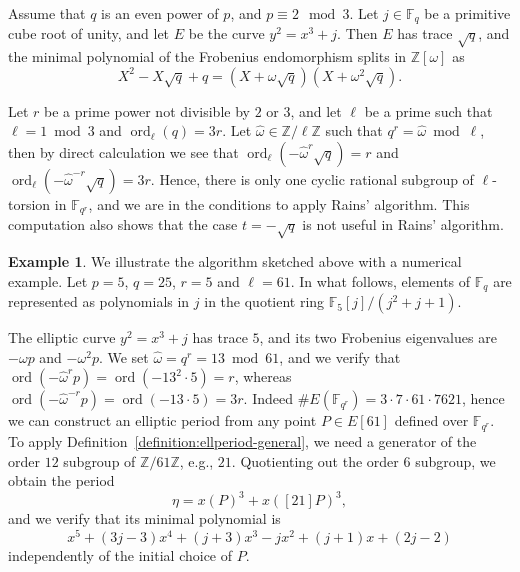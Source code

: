 \documentclass[12pt]{article}
\theoremstyle{plain}
\theoremstyle{definition}
\newtheorem{example}[theorem]{Example}
\DeclareMathOperator{\order}{ord} %
\def\Z{\ensuremath{\mathbb{Z}}}
\def\F{\ensuremath{\mathbb{F}}}
\newcounter{algorithm}
\begin{document}
Assume that $q$ is an even power of $p$, and $p\equiv 2\mod 3$. %
Let $j\in\F_q$ be a primitive cube root of unity, and let $E$ be the
curve $y^2=x^3+j$. %
Then $E$ has trace $\sqrt{q}$, and the minimal polynomial of the
Frobenius endomorphism splits in $\Z[\omega]$ as
\begin{equation*}
  X^2 - X\sqrt{q} + q = (X+\omega\sqrt{q})(X+\omega^2\sqrt{q}).
\end{equation*}

Let $r$ be a prime power not divisible by $2$ or $3$, and let $\ell$
be a prime such that $\ell=1\bmod 3$ and $\order_\ell(q)=3r$. %
Let $\hat\omega\in\Z/\ell\Z$ such that $q^r=\hat\omega\bmod\ell$, then
by direct calculation we see that
$\order_\ell(-\hat\omega^r\sqrt{q})=r$ and
$\order_\ell(-\hat\omega^{-r}\sqrt{q})=3r$. %
Hence, there is only one cyclic rational subgroup of $\ell$-torsion in
$\F_{q^r}$, and we are in the conditions to apply Rains' algorithm. %
This computation also shows that the case $t=-\sqrt{q}$ is not useful
in Rains' algorithm.

\begin{example}
  We illustrate the algorithm sketched above with a numerical
  example. %
  Let $p=5$, $q=25$, $r=5$ and $\ell=61$. %
  In what follows, elements of $\F_q$ are represented as polynomials
  in $j$ in the quotient ring $\F_5[j]/(j^2+j+1)$. %

  The elliptic curve $y^2=x^3+j$ has trace $5$, and its two Frobenius
  eigenvalues are $-\omega p$ and $-\omega^2 p$. %
  We set $\hat\omega=q^r=13\bmod 61$, and we verify that
  $\order(-\hat\omega^r p)=\order(-13^2\cdot 5)=r$, whereas
  $\order(-\hat\omega^{-r} p)=\order(-13\cdot 5)=3r$. %
  Indeed $\#E(\F_{q^r})= 3\cdot7\cdot61\cdot7621$, hence we can
  construct an elliptic period from any point $P\in E[61]$ defined
  over $\F_{q^r}$. %
  To apply Definition~\ref{definition:ellperiod-general}, we need a
  generator of the order $12$ subgroup of $\Z/61\Z$, e.g., $21$. %
  Quotienting out the order $6$ subgroup, we obtain the period
  \begin{equation*}
    \eta = x(P)^3 + x([21]P)^3,
  \end{equation*}
  and we verify that its minimal polynomial is
  \begin{equation*}
    x^5 + (3j-3)x^4 + (j+3)x^3 -jx^2 + (j+1)x + (2j-2)    
  \end{equation*}
  independently of the initial choice of $P$.
\end{example}
\end{document}
